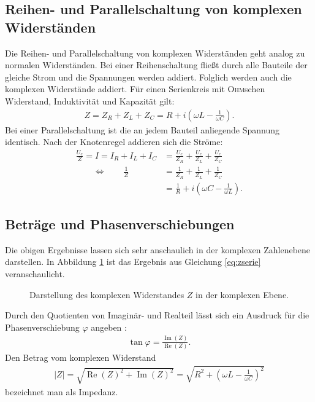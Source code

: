 \documentclass[12pt,a4paper,titlepage,headinclude]{scrartcl}
\numberwithin{equation}{section}
\newcommand{\aeqiv}{\ensuremath{\qquad \Longleftrightarrow \qquad}} %
\newcommand{\person}[1]{\textsc{#1}}
\begin{document}
\subsection{Reihen- und Parallelschaltung von komplexen Widerständen}
Die Reihen- und Parallelschaltung von komplexen Widerständen geht analog zu normalen Widerständen. Bei einer Reihenschaltung fließt durch alle Bauteile der gleiche Strom und die Spannungen werden addiert. Folglich werden auch die komplexen Widerstände addiert. Für einen Serienkreis mit \person{Ohm}schen Widerstand, Induktivität und Kapazität gilt:
\begin{align}
	Z=Z_R+Z_L+Z_C=R+i\left( \omega L-\frac{1}{\omega C} \right).
	\label{eq:zserie}
\end{align}
Bei einer Parallelschaltung ist die an jedem Bauteil anliegende Spannung identisch. Nach der Knotenregel \cite[55]{demtroeder2} addieren sich die Ströme:
\begin{align}
	\frac{U_e}{Z}=I=I_R+I_L+I_C&=\frac{U_e}{Z_R}+\frac{U_e}{Z_L}+\frac{U_e}{Z_C}\\
	\aeqiv \frac{1}{Z}&=\frac{1}{Z_R}+\frac{1}{Z_L}+\frac{1}{Z_C}\\
	&=\frac{1}{R}+i\left( \omega C- \frac{1}{\omega L}\right).
	\label{eq:zpara}
\end{align}
\subsection{Beträge und Phasenverschiebungen}
Die obigen Ergebnisse lassen sich sehr anschaulich in der komplexen Zahlenebene darstellen. In Abbildung \ref{fig:theozeiger} ist das Ergebnis aus Gleichung \eqref{eq:zserie} veranschaulicht. 
\begin{figure}[htb]
	\centering
	
	\caption{Darstellung des komplexen Widerstandes $Z$ in der komplexen Ebene.}
	\label{fig:theozeiger}
\end{figure}
Durch den Quotienten von Imaginär- und Realteil lässt sich ein Ausdruck für die Phasenverschiebung $\varphi$ angeben \cite[153]{demtroeder2}:
\begin{align}
	\tan\varphi=\frac{\operatorname{Im}(Z)}{\operatorname{Re}(Z)}.
	\label{eq:phase}
\end{align}
Den Betrag vom komplexen Widerstand 
\begin{align}
	|Z|=\sqrt{\operatorname{Re}(Z)^2+\operatorname{Im}(Z)^2}=\sqrt{R^2+\left(\omega L-\frac{1}{\omega C}\right)^2}
	\label{eq:impedanz}
\end{align}
bezeichnet man als Impedanz.
\end{document}
